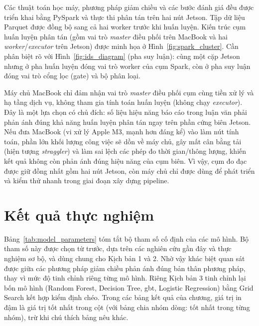 Các thuật toán học máy, phương pháp giảm chiều và các bước đánh giá đều được triển khai bằng PySpark và thực thi phân tán trên hai nút Jetson. Tập dữ liệu Parquet được đồng bộ sang cả hai worker trước khi huấn luyện. Kiến trúc cụm huấn luyện phân tán (gồm vai trò \textit{master} điều phối trên MacBook và hai \textit{worker}/\textit{executor} trên Jetson) được minh họa ở Hình~\ref{fig:spark_cluster}. Cần phân biệt rõ với Hình~\ref{fig:ids_diagram} (pha suy luận): cùng một cặp Jetson nhưng ở pha huấn luyện đóng vai trò worker của cụm Spark, còn ở pha suy luận đóng vai trò cổng lọc (gate) và bộ phân loại.

Máy chủ MacBook chỉ đảm nhận vai trò \textit{master} điều phối cụm cùng tiền xử lý và hạ tầng dịch vụ, không tham gia tính toán huấn luyện (không chạy \textit{executor}). Đây là một lựa chọn có chủ đích: số liệu hiệu năng báo cáo trong luận văn phải phản ánh đúng khả năng huấn luyện phân tán ngay trên phần cứng biên Jetson. Nếu đưa MacBook (vi xử lý Apple M3, mạnh hơn đáng kể) vào làm nút tính toán, phần lớn khối lượng công việc sẽ dồn về máy chủ, gây mất cân bằng tải (hiện tượng \textit{straggler}) và làm sai lệch các phép đo thời gian/thông lượng, khiến kết quả không còn phản ánh đúng hiệu năng của cụm biên. Vì vậy, cụm đo đạc được giữ đồng nhất gồm hai nút Jetson, còn máy chủ chỉ được dùng để phát triển và kiểm thử nhanh trong giai đoạn xây dựng pipeline.

\section{Kết quả thực nghiệm}


\vspace{1em}
Bảng~\ref{tab:model_parameters} tóm tắt bộ tham số cố định của các mô hình. Bộ tham số này được chọn từ trước, dựa trên các nghiên cứu gần đây và thực nghiệm sơ bộ, và dùng chung cho Kịch bản 1 và 2. Nhờ vậy khác biệt quan sát được giữa các phương pháp giảm chiều phản ánh đúng bản thân phương pháp, thay vì mức độ tinh chỉnh riêng từng mô hình. Riêng Kịch bản 3 tinh chỉnh lại bốn mô hình (Random Forest, Decision Tree, \ac{gbt}, Logistic Regression) bằng Grid Search kết hợp kiểm định chéo. Trong các bảng kết quả của chương, giá trị in đậm là giá trị tốt nhất trong cột (với bảng chia nhóm dòng: tốt nhất trong từng nhóm), trừ khi chú thích bảng nêu khác.

